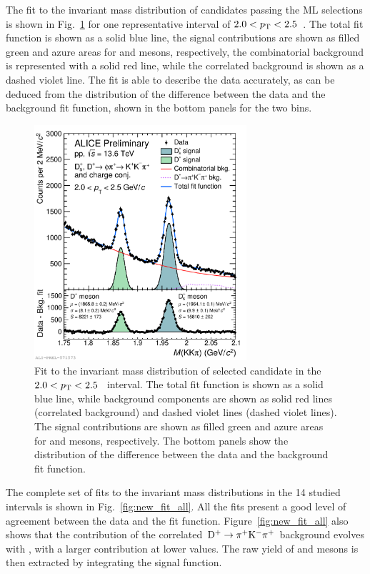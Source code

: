 The fit to the invariant mass distribution of candidates passing the ML selections is shown in Fig.~\ref{fig:new_fit} for one representative \pt interval of $2.0<p_\mathrm{T}<2.5$~\gevc. The total fit function is shown as a solid blue line, the signal contributions are shown as filled green and azure areas for \dpl and \ds mesons, respectively, the combinatorial background is represented with a solid red line, while the correlated background is shown as a dashed violet line. The fit is able to describe the data accurately, as can be deduced from the distribution of the difference between the data and the background fit function, shown in the bottom panels for the two \pt bins. 

\begin{figure}[htb]
    \centering
    \includegraphics[width=0.7\textwidth]{Figures/Chapter 5/invmassfit_2_2p5.pdf}
    \caption{Fit to the invariant mass distribution of selected candidate in the \mbox{$2.0<p_\mathrm{T}<2.5$~\gevc} interval. The total fit function is shown as a solid blue line, while background components are shown as solid red lines (correlated background) and dashed violet lines (dashed violet lines). The signal contributions are shown as filled green and azure areas for \dpl and \ds mesons, respectively. The bottom panels show the distribution of the difference between the data and the background fit function.}
    \label{fig:new_fit}
\end{figure}

The complete set of fits to the invariant mass distributions in the 14 studied \pt intervals is shown in Fig.~\ref{fig:new_fit_all}. All the fits present a good level of agreement between the data and the fit function. Figure~\ref{fig:new_fit_all} also shows that the contribution of the correlated $\mathrm{D^+}\rightarrow\mathrm{\pi^+K^-\pi^+}$ background evolves with \pt, with a larger contribution at lower \pt values. The raw yield of \ds and \dpl mesons is then extracted by integrating the signal function.

